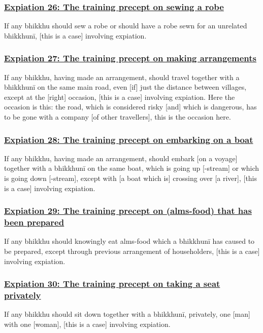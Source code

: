 \subsubsection*{\hyperref[pac26]{Expiation 26: The training precept on sewing a robe}}
\label{exp26}
If any bhikkhu should sew a robe or should have a robe sewn for an unrelated bhikkhunī, [this is a case] involving expiation.



\subsubsection*{\hyperref[pac27]{Expiation 27: The training precept on making arrangements}}
\label{exp27}
If any bhikkhu, having made an arrangement, should travel together with a bhikkhunī on the same main road, even [if] just the distance between villages, except at the [right] occasion, [this is a case] involving expiation. Here the occasion is this: the road, which is considered risky [and] which is dangerous, has to be gone with a company [of other travellers], this is the occasion here.



\subsubsection*{\hyperref[pac28]{Expiation 28: The training precept on embarking on a boat}}
\label{exp28}
If any bhikkhu, having made an arrangement, should embark [on a voyage] together with a bhikkhunī on the same boat, which is going up [-stream] or which is going down [-stream], except with [a boat which is] crossing over [a river], [this is a case] involving expiation.



\subsubsection*{\hyperref[pac29]{Expiation 29: The training precept on (alms-food) that has been prepared}}
\label{exp29}
If any bhikkhu should knowingly eat alms-food which a bhikkhunī has caused to be prepared, except through previous arrangement of householders, [this is a case] involving expiation.



\subsubsection*{\hyperref[pac30]{Expiation 30: The training precept on taking a seat privately}}
\label{exp30}
If any bhikkhu should sit down together with a bhikkhunī, privately, one [man] with one [woman], [this is a case] involving expiation.

